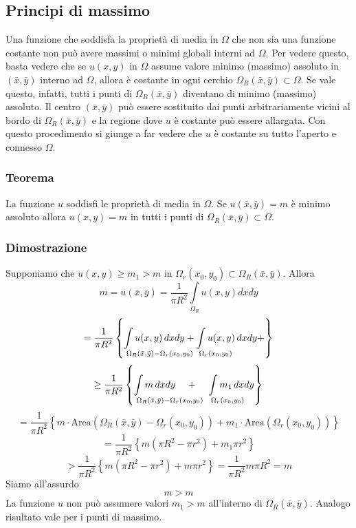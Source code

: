 \subsection{Principi di massimo}
Una funzione che soddisfa la propriet\`a di media in $\Omega$ che non sia
una funzione costante non pu\`o avere massimi o minimi globali interni ad
$\Omega$.
Per vedere questo, basta vedere che se $u(x,y)$ in $\Omega$ assume valore
minimo (massimo) assoluto in $(\bar{x}, \bar{y})$ interno ad $\Omega$,
allora \`e costante in ogni cerchio $\Omega_R(\bar{x}, \bar{y})\subset \Omega$.
Se vale questo, infatti, tutti i punti di $\Omega_R(\bar{x}, \bar{y})$ diventano
di minimo (massimo) assoluto.
Il centro $(\bar{x}, \bar{y})$ pu\`o essere sostituito dai punti arbitrariamente
vicini al bordo di $\Omega_R(\bar{x}, \bar{y})$ e la regione dove $u$ \`e
costante
pu\`o essere allargata.
Con questo procedimento si giunge a far vedere che $u$ \`e costante su tutto
l'aperto e connesso $\Omega$.
\subsubsection{Teorema}
La  funzione $u$ soddisfi le propriet\`a di media in $\Omega$.
Se $u(\bar{x}, \bar{y})=m$ \`e minimo assoluto allora $u(x,y)=m$ in tutti
i punti di $\Omega_R(\bar{x}, \bar{y})\subset \Omega$.
\subsubsection{Dimostrazione}
Supponiamo che $u(x,y)\geq m_1 > m$ in $\Omega_r (x_0, y_0)\subset \Omega_R
(\bar{x}, \bar{y})$.
Allora
\[
	m= u(\bar{x}, \bar{y})=
	\frac{1}{\pi R^2}
	\int \limits_{\Omega_R} u(x,y) dx dy
\]
\[
	= \frac{1}{\pi R^2} \left\{
	\int \limits_{\mathrlap{\Omega_R (\bar{x}, \bar{y}) - \Omega_r
(x_0,y_0)}}
	u(x,y) \, dxdy +
	\int \limits_{\mathrlap{\Omega_r (x_0,y_0)}}
	u(x,y) \, dxdy +
	\right\}
\]
\[
	\geq \frac{1}{\pi R^2} \left\{
	\int \limits_{\mathrlap{\Omega_R (\bar{x}, \bar{y}) - \Omega_r
(x_0,y_0)}}
	m \, dxdy \;\;\;\; + \;\;\;\;
	\int \limits_{\mathrlap{\Omega_r (x_0,y_0)}}
	m_1 \, dxdy
	\right\}
\]
\[
	= \frac{1}{\pi R^2} \left\{
	m \cdot \text{Area} \left( \Omega_R (\bar{x}, \bar{y}) - \Omega_r
(x_0,y_0) \right) +
	m_1 \cdot \text{Area} \left(\Omega_r (x_0,y_0) \right)
	\right\}
\]
\[
	= \frac{1}{\pi R^2} \left\{
	m (\pi R^2 - \pi r^2) + m_1 \pi r^2
	\right\}
\]
\[
	> \frac{1}{\pi R^2} \left\{
	m (\pi R^2 - \pi r^2) + m \pi r^2
	\right\} =
	\frac{1}{\pi R^2} m\pi R^2 = m
\]
Siamo all'assurdo
\[
	m>m
\]
La funzione $u$ non pu\`o assumere valori $m_1>m$ all'interno di
$\Omega_R(\bar{x}, \bar{y})$.
Analogo risultato vale per i punti di massimo.
